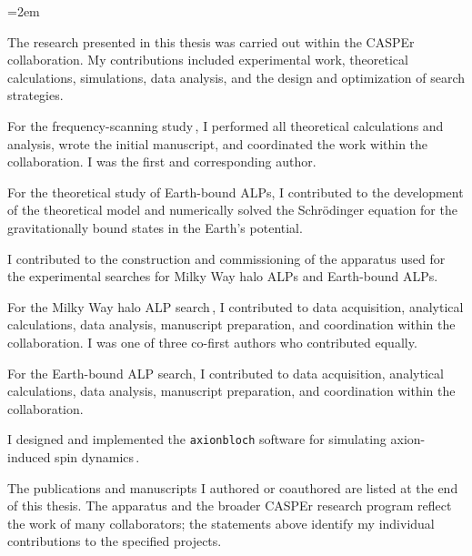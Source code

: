 \begingroup
\emergencystretch=2em

The research presented in this thesis was carried out within the CASPEr collaboration. 
My contributions included experimental work, theoretical calculations, simulations, data analysis, and the design and optimization of search strategies.

For the frequency-scanning study\,\cite{Yuzhe2023_FrequencyScanning}, I performed all theoretical calculations and analysis, wrote the initial manuscript, and coordinated the work within the collaboration.
I was the first and corresponding author.

For the theoretical study of Earth-bound ALPs, I contributed to the development of the theoretical model and numerically solved the Schrödinger equation for the gravitationally bound states in the Earth's potential.

I contributed to the construction and commissioning of the apparatus used for the experimental searches for Milky Way halo ALPs and Earth-bound ALPs.

For the Milky Way halo ALP search\,\cite{Walter2025_CASPErLFthermal}, I contributed to data acquisition, analytical calculations, data analysis, manuscript preparation, and coordination within the collaboration.
I was one of three co-first authors who contributed equally.

For the Earth-bound ALP search, I contributed to data acquisition, analytical calculations, data analysis, manuscript preparation, and coordination within the collaboration.

I designed and implemented the \texttt{axionbloch} software for simulating axion-induced spin dynamics\,\cite{Zhang2026_axionbloch,Zhang2026_repoAxionBloch}.

The publications and manuscripts I authored or coauthored are listed at the end of this thesis. 
The apparatus and the broader CASPEr research program reflect the work of many collaborators; the statements above identify my individual contributions to the specified projects.
\par\endgroup
